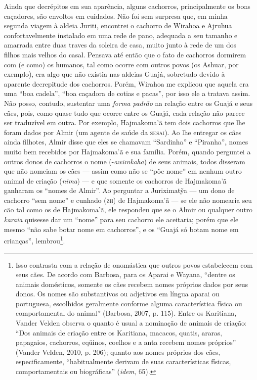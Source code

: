 Ainda que decrépitos em sua aparência, alguns cachorros, principalmente
os bons caçadores, são envoltos em cuidados. Não foi sem surpresa que,
em minha segunda viagem à aldeia Juriti, encontrei o cachorro de Wirahoa
e Ajruhua confortavelmente instalado em uma rede de pano, adequada a seu
tamanho e amarrada entre duas traves da soleira de casa, muito junto à
rede de um dos filhos mais velhos do casal. Pensava até então que o fato
de cachorros dormirem com (e como) os humanos, tal como ocorre com
outros povos (os Ashuar, por exemplo), era algo que não existia nas
aldeias Guajá, sobretudo devido à aparente decrepitude dos cachorros.
Porém, Wirahoa me explicou que aquela era uma ``boa cadela'', ``boa
caçadora de cotias e pacas'', por isso ele a tratava assim. Não posso,
contudo, sustentar uma \emph{forma padrão} na relação entre os Guajá e
seus cães, pois, como quase tudo que ocorre entre os Guajá, cada relação
não parece ser traduzível em outra. Por exemplo, Hajmakoma'ã tem dois
cachorros que lhe foram dados por Almir (um agente de saúde da \textsc{sesai}).
Ao lhe entregar os cães ainda filhotes, Almir disse que eles se chamavam
``Sardinha'' e ``Piranha'', nomes muito bem recebidos por Hajmakoma'ã e sua
família. Porém, quando perguntei a outros donos de cachorros o nome
(-\emph{awirokaha}) de seus animais, todos disseram que não nomeiam os
cães --- assim como não se ``põe nome'' em nenhum outro animal de criação
(\emph{nima}) --- e que somente os cachorros de Hajmakoma'ã ganharam os
``nomes de Almir''. Ao perguntar a Juriximatỹa --- um dono de cachorro ``sem
nome'' e cunhado (\textsc{zh}) de Hajmakoma'ã --- se ele não nomearia seu cão tal
como os de Hajmakoma'ã, ele respondeu que se o Almir ou qualquer outro
\emph{karaia} quisesse dar um ``nome'' para seu cachorro ele aceitaria;
porém que ele mesmo ``não sabe botar nome em cachorros'', e os ``Guajá só
botam nome em crianças'', lembrou\footnote{Isso contrasta com a relação
  de onomástica que outros povos estabelecem com seus cães. De acordo
  com Barbosa, para os Aparai e Wayana, ``dentre os animais domésticos,
  somente os cães recebem nomes próprios dados por seus donos. Os nomes
  são substantivos ou adjetivos em língua aparai ou portuguesa,
  escolhidos geralmente conforme alguma característica física ou
  comportamental do animal'' (Barbosa, 2007, p. 115). Entre os Karitiana,
  Vander Velden observa o quanto é usual a nominação de animais de
  criação: ``Dos animais de criação entre os Karitiana, macacos, quatis,
  araras, papagaios, cachorros, eqüinos, coelhos e a anta recebem nomes
  próprios'' (Vander Velden, 2010, p. 206); quanto aos nomes próprios dos
  cães, especificamente, ``habitualmente derivam de suas características
  físicas, comportamentais ou biográficas'' (\emph{idem}, 65).}.

